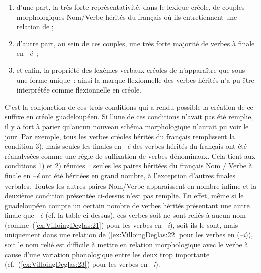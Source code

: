 \documentclass[output=paper]{langsci/langscibook}
\begin{document}
\begin{enumerate}
\def\labelenumi{\arabic{enumi})}

\item
  d'une part, la très forte représentativité, dans le lexique créole, de
  couples morphologiques Nom/Verbe hérités du français où ils
  entretiennent une relation de  ;
\item
  d'autre part, au sein de ces couples, une très forte majorité de
  verbes à finale en --\emph{é}~;
\item
  et enfin, la propriété des lexèmes verbaux créoles de n'apparaître que
  sous une forme unique~: ainsi la marque flexionnelle des verbes
  hérités n'a pu être interprétée comme flexionnelle en créole.
\end{enumerate}

C'est la conjonction de ces trois conditions qui a rendu possible la
création de ce suffixe en créole guadeloupéen. Si l'une de ces
conditions n'avait pas été remplie, il y a fort à parier qu'aucun
nouveau schéma morphologique n'aurait pu voir le jour. Par exemple, tous
les verbes créoles hérités du français remplissent la condition 3), mais
seules les finales en --\emph{é} des verbes hérités du français ont été
réanalysées comme une règle de suffixation de verbes dénominaux. Cela
tient aux conditions 1) et 2) réunies~: seules les paires héritées du
français Nom / Verbe à finale en --\emph{é} ont été héritées en grand nombre, à
l'exception d'autres finales verbales. Toutes les autres paires
Nom/Verbe apparaissent en nombre infime et la deuxième condition
présentée ci-dessus n'est pas remplie. En effet, même si le guadeloupéen
compte un certain nombre de verbes hérités présentant une autre finale
que --\emph{é} (cf. la table ci-dessus), ces verbes soit ne sont
reliés à aucun nom (comme~(\ref{ex:VilloingDeglas:21}) pour les verbes en \emph{--i}), soit ils le
sont, mais uniquement dans une relation de  (\ref{ex:VilloingDeglas:22} pour les
verbes en (\emph{--i})), soit le nom relié est difficile à mettre en
relation morphologique avec le verbe à cause d'une variation
phonologique entre les deux trop importante (cf.~(\ref{ex:VilloingDeglas:23}) pour les verbes en
--\emph{i}).
\end{document}
